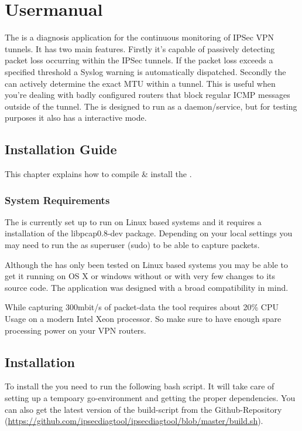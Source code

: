 \chapter{Usermanual}
\label{chap:Usermanual}
The \entool{} is a diagnosis application for the continuous monitoring of \acs{IPSec} \acs{VPN} tunnels. It has two main features. Firstly it's capable of passively detecting packet loss occurring within the \acs{IPSec} tunnels. If the packet loss exceeds a specified threshold a Syslog warning is automatically dispatched. Secondly the \entool{} can actively determine the exact \acs{MTU} within a tunnel. This is useful when you're dealing with badly configured routers that block regular \acs{ICMP} messages outside of the tunnel. The \entool{} is designed to run as a daemon/service, but for testing purposes it also has a interactive mode.

\section{Installation Guide}
This chapter explains how to compile \& install the \entool{}.

\subsection{System Requirements}
The \entool{} is currently set up to run on Linux based systems and it requires a installation of the libpcap0.8-dev package. Depending on your local settings you may need to run the \entool{} as superuser (sudo) to be able to capture packets.

Although the \entool{} has only been tested on Linux based systems you may be able to get it running on OS X or windows without or with very few changes to its source code. The application was designed with a broad compatibility in mind.

While capturing 300mbit/s of packet-data the tool requires about 20\% CPU Usage on a modern Intel Xeon processor. So make sure to have enough spare processing power on your VPN routers.


\section{Installation}
To install the \entool{} you need to run the following bash script. It will take care of setting up a tempoary go-environment and getting the proper dependencies. You can also get the latest version of the build-script from the Github-Repository (\url{https://github.com/ipsecdiagtool/ipsecdiagtool/blob/master/build.sh}).

